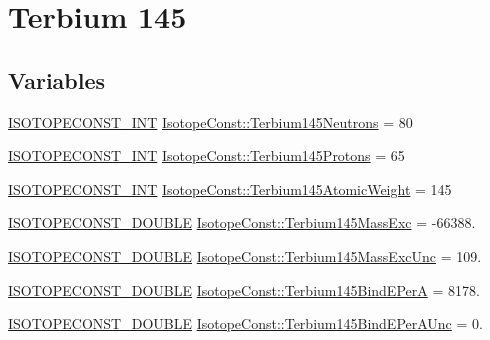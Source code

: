 \hypertarget{group___isotope_const-_terbium-_tb145}{}\section{Terbium 145}
\label{group___isotope_const-_terbium-_tb145}
\subsection*{Variables}
\begin{DoxyCompactItemize}
\item 
\mbox{\hyperlink{group___isotope_const-_macros_ga5f18360b3e99483a35c32d789e62621c}{I\+S\+O\+T\+O\+P\+E\+C\+O\+N\+S\+T\+\_\+\+I\+NT}} \mbox{\hyperlink{group___isotope_const-_terbium-_tb145_ga3357e262f18247bed7b770c10f4c71e3}{Isotope\+Const\+::\+Terbium145\+Neutrons}} = 80
\item 
\mbox{\hyperlink{group___isotope_const-_macros_ga5f18360b3e99483a35c32d789e62621c}{I\+S\+O\+T\+O\+P\+E\+C\+O\+N\+S\+T\+\_\+\+I\+NT}} \mbox{\hyperlink{group___isotope_const-_terbium-_tb145_gafd1298d0911d2db89a78e8c5e085a47d}{Isotope\+Const\+::\+Terbium145\+Protons}} = 65
\item 
\mbox{\hyperlink{group___isotope_const-_macros_ga5f18360b3e99483a35c32d789e62621c}{I\+S\+O\+T\+O\+P\+E\+C\+O\+N\+S\+T\+\_\+\+I\+NT}} \mbox{\hyperlink{group___isotope_const-_terbium-_tb145_gaccbdf6a4de89bb9950de9380c2ea36c1}{Isotope\+Const\+::\+Terbium145\+Atomic\+Weight}} = 145
\item 
\mbox{\hyperlink{group___isotope_const-_macros_ga8f45a7272ce02c0b4c65c44636ed719a}{I\+S\+O\+T\+O\+P\+E\+C\+O\+N\+S\+T\+\_\+\+D\+O\+U\+B\+LE}} \mbox{\hyperlink{group___isotope_const-_terbium-_tb145_ga8f033d6076bd7de230d8d8d1eb06375a}{Isotope\+Const\+::\+Terbium145\+Mass\+Exc}} = -\/66388.
\item 
\mbox{\hyperlink{group___isotope_const-_macros_ga8f45a7272ce02c0b4c65c44636ed719a}{I\+S\+O\+T\+O\+P\+E\+C\+O\+N\+S\+T\+\_\+\+D\+O\+U\+B\+LE}} \mbox{\hyperlink{group___isotope_const-_terbium-_tb145_ga0082abf4e7494f2df2379216e4b471fd}{Isotope\+Const\+::\+Terbium145\+Mass\+Exc\+Unc}} = 109.
\item 
\mbox{\hyperlink{group___isotope_const-_macros_ga8f45a7272ce02c0b4c65c44636ed719a}{I\+S\+O\+T\+O\+P\+E\+C\+O\+N\+S\+T\+\_\+\+D\+O\+U\+B\+LE}} \mbox{\hyperlink{group___isotope_const-_terbium-_tb145_ga07b67c6b5104ab8861823d92b6d79b02}{Isotope\+Const\+::\+Terbium145\+Bind\+E\+PerA}} = 8178.
\item 
\mbox{\hyperlink{group___isotope_const-_macros_ga8f45a7272ce02c0b4c65c44636ed719a}{I\+S\+O\+T\+O\+P\+E\+C\+O\+N\+S\+T\+\_\+\+D\+O\+U\+B\+LE}} \mbox{\hyperlink{group___isotope_const-_terbium-_tb145_gab0081ec01ed0d09fe0045d7da91035b2}{Isotope\+Const\+::\+Terbium145\+Bind\+E\+Per\+A\+Unc}} = 0.

\end{DoxyCompactItemize}
